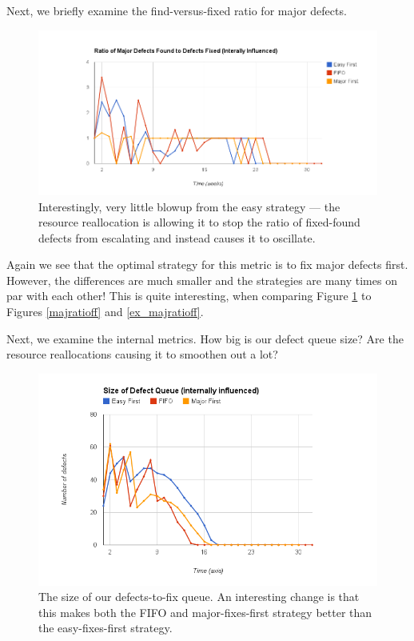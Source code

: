 \pagebreak

Next, we briefly examine the find-versus-fixed ratio for major defects.

\begin{figure}[ht!]
	\centering
	\includegraphics[scale=0.45]{graphs/MajRatioFF_in.png}
	\caption{Interestingly, very little blowup from the easy strategy --- the resource reallocation is
allowing it to stop the ratio of fixed-found defects from escalating and instead causes it to
oscillate.} 
	\label{in_majratioff}
\end{figure}

Again we see that the optimal strategy for this metric is to fix major defects first.
However, the differences are much smaller and the strategies are many times on par with each other!
This is quite interesting, when comparing Figure \ref{in_majratioff} to Figures \ref{majratioff} and
\ref{ex_majratioff}.

\pagebreak

Next, we examine the internal metrics.
How big is our defect queue size?
Are the resource reallocations causing it to smoothen out a lot?

\begin{figure}[ht!]
	\centering
	\includegraphics[scale=0.45]{graphs/QueueSz_in.png}
	\caption{The size of our defects-to-fix queue.
An interesting change is that this makes both the FIFO and major-fixes-first strategy better than
the easy-fixes-first strategy.} 
	\label{in_qsz}
\end{figure}

